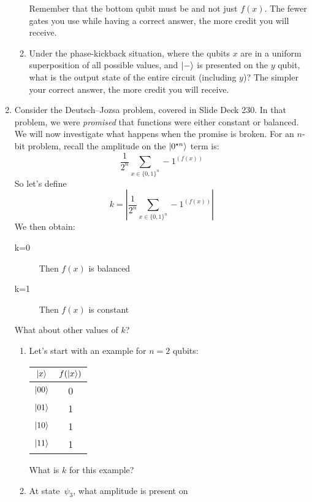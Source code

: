 \documentclass[12pt]{article}
\begin{document}
\begin{enumerate}[font=\bfseries]
\begin{enumerate}[label=\theenumi.\arabic*]
\begin{center}
\begin{tabular}{c|c}
            \end{tabular}
        \end{center}
        Remember that the bottom qubit must be  and not just $f(x)$.
        The fewer gates you use while having a correct answer, the more credit you will receive.
        \LeaveSpace{}
        \item Under the phase-kickback situation, where the qubits $x$ are in a uniform superposition of all possible values, and $\ket{-}$ is presented on the $y$ qubit, what is the output state of the entire circuit (including $y$)?  The simpler your correct answer, the more credit you will receive.
        \LeaveSpace{}
    \end{enumerate}
     \item{} Consider the Deutsch--Jozsa problem, covered in Slide Deck 230. In that problem, we were \emph{promised} that functions were either constant or balanced. We will now investigate what happens when the promise is broken.  For an $n$-bit problem, recall the amplitude on the $\ket{0^{\star n}}$ term is:
     \[
       \frac{1}{2^n}\sum_{x\in \{0,1\}^{n}} -1^{(f(x))}
     \]
     So let's define
         \[
       k = \left|\frac{1}{2^n}\sum_{x\in \{0,1\}^{n}} -1^{(f(x))}\right|
     \]
     We then obtain:
     \begin{description}
         \item[k=0] Then $f(x)$ is balanced
         \item[k=1] Then $f(x)$ is constant
     \end{description}
     What about other values of $k$?
    \begin{enumerate}[label=\theenumi.\arabic*]
        \item Let's start with an example for $n = 2$ qubits:
        \begin{center}
            \begin{tabular}{c|c}
                 $\ket{x}$&$f(\ket{x})$  \\\hline
                 $\ket{00}$ & 0 \\
                 $\ket{01}$ & 1 \\
                 $\ket{10}$ & 1 \\
                 $\ket{11}$ & 1 \\
            \end{tabular}
        \end{center}
        What is $k$ for this example?\Blank{}
        \item At state~$\psi_{3}$, what amplitude is present on

\end{enumerate}
\end{enumerate}
\end{document}
